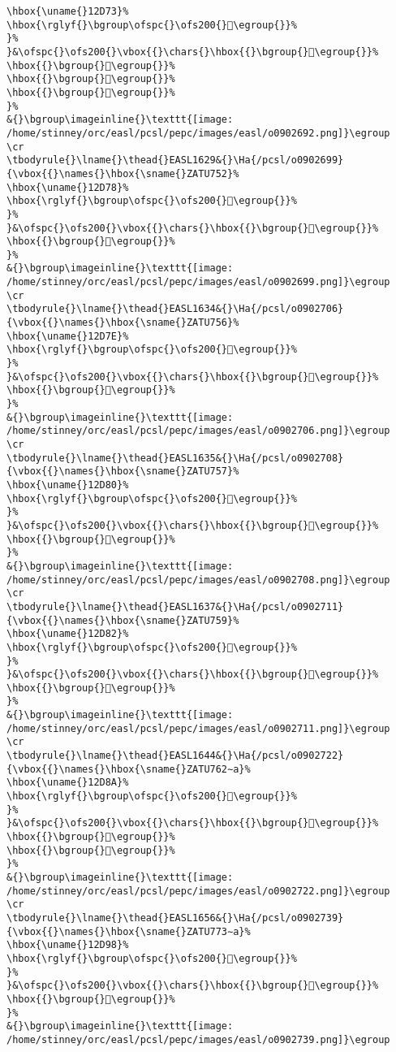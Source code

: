 \begin{verbatim}
\hbox{\uname{}12D73}%
\hbox{\rglyf{}\bgroup\ofspc{}\ofs200{}𒵳\egroup{}}%
}%
}&\ofspc{}\ofs200{}\vbox{{}\chars{}\hbox{{}\bgroup{}𒵱\egroup{}}%
\hbox{{}\bgroup{}𒵲\egroup{}}%
\hbox{{}\bgroup{}𒵳\egroup{}}%
\hbox{{}\bgroup{}𒵴\egroup{}}%
}%
&{}\bgroup\imageinline{}\texttt{[image: /home/stinney/orc/easl/pcsl/pepc/images/easl/o0902692.png]}\egroup
\cr
\tbodyrule{}\lname{}\thead{}EASL1629&{}\Ha{/pcsl/o0902699}{\vbox{{}\names{}\hbox{\sname{}ZATU752}%
\hbox{\uname{}12D78}%
\hbox{\rglyf{}\bgroup\ofspc{}\ofs200{}𒵸\egroup{}}%
}%
}&\ofspc{}\ofs200{}\vbox{{}\chars{}\hbox{{}\bgroup{}𒵷\egroup{}}%
\hbox{{}\bgroup{}𒵸\egroup{}}%
}%
&{}\bgroup\imageinline{}\texttt{[image: /home/stinney/orc/easl/pcsl/pepc/images/easl/o0902699.png]}\egroup
\cr
\tbodyrule{}\lname{}\thead{}EASL1634&{}\Ha{/pcsl/o0902706}{\vbox{{}\names{}\hbox{\sname{}ZATU756}%
\hbox{\uname{}12D7E}%
\hbox{\rglyf{}\bgroup\ofspc{}\ofs200{}𒵾\egroup{}}%
}%
}&\ofspc{}\ofs200{}\vbox{{}\chars{}\hbox{{}\bgroup{}𒵽\egroup{}}%
\hbox{{}\bgroup{}𒵾\egroup{}}%
}%
&{}\bgroup\imageinline{}\texttt{[image: /home/stinney/orc/easl/pcsl/pepc/images/easl/o0902706.png]}\egroup
\cr
\tbodyrule{}\lname{}\thead{}EASL1635&{}\Ha{/pcsl/o0902708}{\vbox{{}\names{}\hbox{\sname{}ZATU757}%
\hbox{\uname{}12D80}%
\hbox{\rglyf{}\bgroup\ofspc{}\ofs200{}𒶀\egroup{}}%
}%
}&\ofspc{}\ofs200{}\vbox{{}\chars{}\hbox{{}\bgroup{}𒵿\egroup{}}%
\hbox{{}\bgroup{}𒶀\egroup{}}%
}%
&{}\bgroup\imageinline{}\texttt{[image: /home/stinney/orc/easl/pcsl/pepc/images/easl/o0902708.png]}\egroup
\cr
\tbodyrule{}\lname{}\thead{}EASL1637&{}\Ha{/pcsl/o0902711}{\vbox{{}\names{}\hbox{\sname{}ZATU759}%
\hbox{\uname{}12D82}%
\hbox{\rglyf{}\bgroup\ofspc{}\ofs200{}𒶂\egroup{}}%
}%
}&\ofspc{}\ofs200{}\vbox{{}\chars{}\hbox{{}\bgroup{}𒶈\egroup{}}%
\hbox{{}\bgroup{}𒶂\egroup{}}%
}%
&{}\bgroup\imageinline{}\texttt{[image: /home/stinney/orc/easl/pcsl/pepc/images/easl/o0902711.png]}\egroup
\cr
\tbodyrule{}\lname{}\thead{}EASL1644&{}\Ha{/pcsl/o0902722}{\vbox{{}\names{}\hbox{\sname{}ZATU762∼a}%
\hbox{\uname{}12D8A}%
\hbox{\rglyf{}\bgroup\ofspc{}\ofs200{}𒶊\egroup{}}%
}%
}&\ofspc{}\ofs200{}\vbox{{}\chars{}\hbox{{}\bgroup{}𒶍\egroup{}}%
\hbox{{}\bgroup{}𒶌\egroup{}}%
\hbox{{}\bgroup{}𒶊\egroup{}}%
}%
&{}\bgroup\imageinline{}\texttt{[image: /home/stinney/orc/easl/pcsl/pepc/images/easl/o0902722.png]}\egroup
\cr
\tbodyrule{}\lname{}\thead{}EASL1656&{}\Ha{/pcsl/o0902739}{\vbox{{}\names{}\hbox{\sname{}ZATU773∼a}%
\hbox{\uname{}12D98}%
\hbox{\rglyf{}\bgroup\ofspc{}\ofs200{}𒶘\egroup{}}%
}%
}&\ofspc{}\ofs200{}\vbox{{}\chars{}\hbox{{}\bgroup{}𒶘\egroup{}}%
\hbox{{}\bgroup{}𒶙\egroup{}}%
}%
&{}\bgroup\imageinline{}\texttt{[image: /home/stinney/orc/easl/pcsl/pepc/images/easl/o0902739.png]}\egroup

\end{verbatim}
